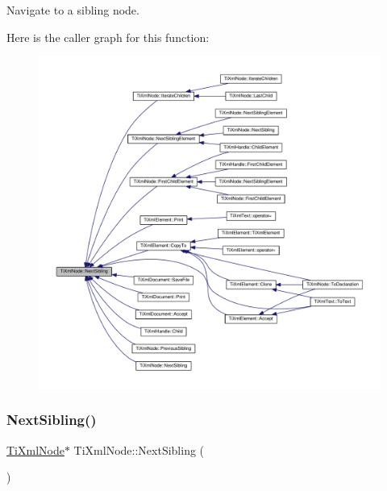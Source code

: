 Navigate to a sibling node. 

Here is the caller graph for this function\+:
\nopagebreak
\begin{figure}[H]
\begin{center}
\leavevmode
\includegraphics[width=350pt]{class_ti_xml_node_ae99c572ac7901a15993ea7a4efaa10e7_icgraph}
\end{center}
\end{figure}
\mbox{\label{class_ti_xml_node_a4d05f7b1d7b470ac6887edd072d4892a}} 
\subsubsection{\texorpdfstring{Next\+Sibling()}{NextSibling()}\hspace{0.1cm}{\footnotesize\ttfamily [2/4]}}
{\footnotesize\ttfamily \hyperlink{class_ti_xml_node}{Ti\+Xml\+Node}$\ast$ Ti\+Xml\+Node\+::\+Next\+Sibling (\begin{DoxyParamCaption}{ }\end{DoxyParamCaption})\hspace{0.3cm}{\ttfamily [inline]}}

